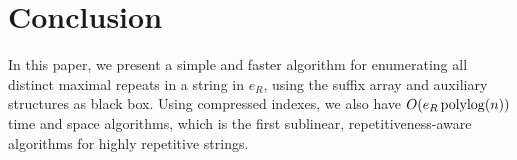 \section{Conclusion}
\label{sec:conc}
In this paper, we present a simple and faster algorithm
for enumerating all distinct maximal repeats in a string
in $e_R$, using the suffix array and auxiliary structures as black box. Using compressed indexes, we also have $O(e_R \operatorname{\mathrm{polylog}}(n))$ time and space algorithms, which is the first sublinear, repetitiveness-aware algorithms for highly repetitive strings.



